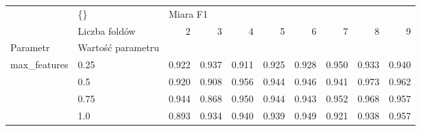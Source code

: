 \begin{tabular}{llrrrrrrrr}
\hline
             & \{\} & \multicolumn{8}{l}{Miara F1} \\
             & Liczba foldów &        2 &      3 &      4 &      5 &      6 &      7 &      8 &      9 \\
Parametr & Wartość parametru &          &        &        &        &        &        &        &        \\
\hline
max\_features & 0.25 &    0.922 &  0.937 &  0.911 &  0.925 &  0.928 &  0.950 &  0.933 &  0.940 \\
             & 0.5 &    0.920 &  0.908 &  0.956 &  0.944 &  0.946 &  0.941 &  0.973 &  0.962 \\
             & 0.75 &    0.944 &  0.868 &  0.950 &  0.944 &  0.943 &  0.952 &  0.968 &  0.957 \\
             & 1.0 &    0.893 &  0.934 &  0.940 &  0.939 &  0.949 &  0.921 &  0.938 &  0.957 \\
\hline
\end{tabular}
